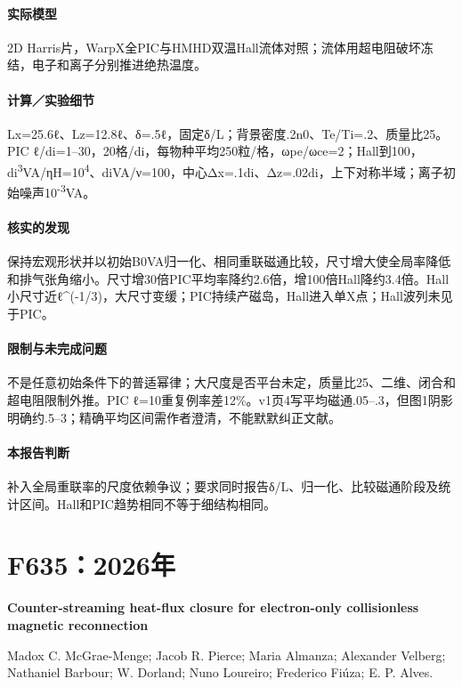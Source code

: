 \paragraph{实际模型}2D Harris片，WarpX全PIC与HMHD双温Hall流体对照；流体用超电阻破坏冻结，电子和离子分别推进绝热温度。

\paragraph{计算／实验细节}Lx=25.6ℓ、Lz=12.8ℓ、δ=.5ℓ，固定δ/L；背景密度.2n0、Te/Ti=.2、质量比25。PIC ℓ/di=1–30，20格/di，每物种平均250粒/格，ωpe/ωce=2；Hall到100，di\textsuperscript{3}VA/ηH=10\textsuperscript{4}、diVA/ν=100，中心Δx=.1di、Δz=.02di，上下对称半域；离子初始噪声10\textsuperscript{-3}VA。

\paragraph{核实的发现}保持宏观形状并以初始B0VA归一化、相同重联磁通比较，尺寸增大使全局率降低和排气张角缩小。尺寸增30倍PIC平均率降约2.6倍，增100倍Hall降约3.4倍。Hall小尺寸近ℓ\textasciicircum{}(-1/3)，大尺寸变缓；PIC持续产磁岛，Hall进入单X点；Hall波列未见于PIC。

\paragraph{限制与未完成问题}不是任意初始条件下的普适幂律；大尺度是否平台未定，质量比25、二维、闭合和超电阻限制外推。PIC ℓ=10重复例率差12\%。v1页4写平均磁通.05–.3，但图1阴影明确约.5–3；精确平均区间需作者澄清，不能默默纠正文献。

\paragraph{本报告判断}补入全局重联率的尺度依赖争议；要求同时报告δ/L、归一化、比较磁通阶段及统计区间。Hall和PIC趋势相同不等于细结构相同。

\section{F635：2026年}\label{paper:F635}

\textbf{Counter-streaming heat-flux closure for electron-only collisionless magnetic reconnection}\citep{F635}\

Madox C. McGrae-Menge;  Jacob R. Pierce;  Maria Almanza;  Alexander Velberg;  Nathaniel Barbour;  W. Dorland;  Nuno Loureiro;  Frederico Fiúza;  E. P. Alves.

